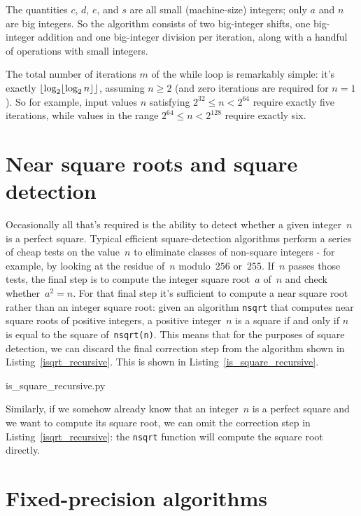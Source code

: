 \documentclass[a4paper]{article}
\DeclarePairedDelimiter\floor{\lfloor}{\rfloor}
\theoremstyle{plain}
\theoremstyle{definition}
\begin{document}
The quantities $c$, $d$, $e$, and $s$ are all small (machine-size) integers;
only $a$ and $n$ are big integers. So the algorithm consists of two big-integer
shifts, one big-integer addition and one big-integer division per iteration,
along with a handful of operations with small integers.

The total number of iterations $m$ of the while loop is remarkably simple: it's
exactly $\floor*{\log_2 \floor{\log_2 n}}$, assuming $n\ge 2$ (and zero
iterations are required for $n = 1$). So for example, input values $n$
satisfying $2^{32} \le n < 2^{64}$ require exactly five iterations, while
values in the range $2^{64} \le n < 2^{128}$ require exactly six.

\section{Near square roots and square detection}

Occasionally all that's required is the ability to detect whether a given
integer~$n$ is a perfect square. Typical efficient square-detection algorithms
perform a series of cheap tests on the value~$n$ to eliminate classes of
non-square integers - for example, by looking at the residue of~$n$
modulo~$256$ or~$255$. If~$n$ passes those tests, the final step is to compute
the integer square root~$a$ of~$n$ and check whether~$a^2 = n$.
For that final step it's sufficient to compute a near square root rather than
an integer square root: given an algorithm \lstinline{nsqrt} that computes near
square roots of positive integers, a positive integer~$n$ is a square if and
only if $n$ is equal to the square of~\lstinline$nsqrt(n)$. This means that for
the purposes of square detection, we can discard the final correction step from
the algorithm shown in Listing~\ref{isqrt_recursive}. This is shown in
Listing~\ref{is_square_recursive}.


  {is_square_recursive.py}

Similarly, if we somehow already know that an integer~$n$ is a perfect square
and we want to compute its square root, we can omit the correction step in
Listing~\ref{isqrt_recursive}: the \lstinline$nsqrt$ function will compute the
square root directly.

\section{Fixed-precision algorithms}
\end{document}
